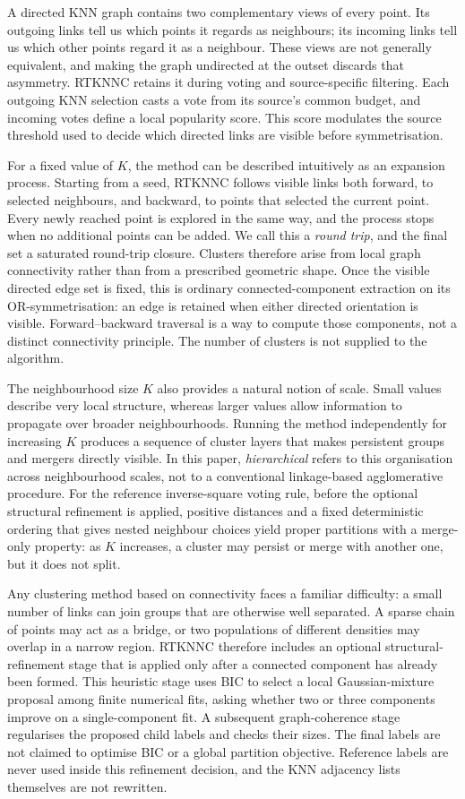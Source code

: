 \documentclass[pdflatex,sn-basic,Numbered]{sn-jnl}
\begin{document}
A directed KNN graph contains two complementary views of every point. Its
outgoing links tell us which points it regards as neighbours; its incoming
links tell us which other points regard it as a neighbour. These views are not
generally equivalent, and making the graph undirected at the outset discards
that asymmetry. RTKNNC retains it during voting and source-specific filtering.
Each outgoing KNN selection casts a vote from its source's common budget, and
incoming votes define a local popularity score. This score modulates the source
threshold used to decide which directed links are visible before symmetrisation.

For a fixed value of $K$, the method can be described intuitively as an
expansion process. Starting from a seed, RTKNNC follows visible links both
forward, to selected neighbours, and backward, to points that selected the
current point. Every newly reached point is explored in the same way, and the
process stops when no additional points can be added. We call this a
\emph{round trip}, and the final set a saturated round-trip closure. Clusters
therefore arise from local graph connectivity rather than from a prescribed
geometric shape. Once the visible directed edge set is fixed, this is ordinary
connected-component extraction on its OR-symmetrisation: an edge is retained
when either directed orientation is visible. Forward--backward traversal is a
way to compute those components, not a distinct connectivity principle. The
number of clusters is not supplied to the algorithm.

The neighbourhood size $K$ also provides a natural notion of scale. Small
values describe very local structure, whereas larger values allow information
to propagate over broader neighbourhoods. Running the method independently for
increasing $K$ produces a sequence of cluster layers that makes persistent
groups and mergers directly visible. In this paper, \emph{hierarchical} refers
to this organisation across neighbourhood scales, not to a conventional
linkage-based agglomerative procedure. For the reference inverse-square voting
rule, before the optional structural refinement is applied, positive distances
and a fixed deterministic ordering that gives nested neighbour choices yield
proper partitions with a merge-only property:
as $K$ increases, a cluster may persist or merge with another one, but it does
not split.

Any clustering method based on connectivity faces a familiar difficulty: a
small number of links can join groups that are otherwise well separated. A
sparse chain of points may act as a bridge, or two populations of different
densities may overlap in a narrow region. RTKNNC therefore includes an optional
structural-refinement stage that is applied only after a connected component
has already been formed. This heuristic stage uses BIC to select a local
Gaussian-mixture proposal among finite numerical fits, asking whether two or
three components improve on a single-component fit. A subsequent graph-coherence
stage regularises the proposed child labels and checks their sizes. The final
labels are not claimed to optimise BIC or a global partition objective.
Reference labels are never used inside this refinement decision, and the KNN
adjacency lists themselves are not rewritten.
\end{document}
